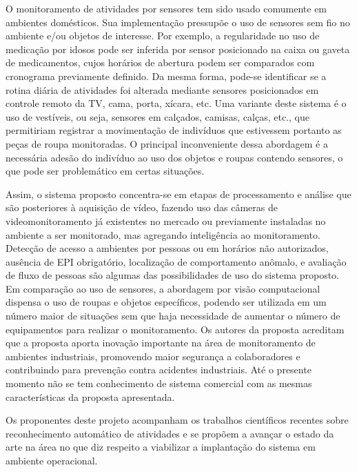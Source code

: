 O monitoramento de atividades por sensores tem sido usado comumente em ambientes domésticos. Sua implementação pressupõe o uso de sensores sem fio no ambiente e/ou objetos de interesse. Por exemplo, a regularidade no uso de medicação por idosos pode ser inferida por sensor posicionado na caixa ou gaveta de medicamentos, cujos horários de abertura podem ser comparados com cronograma previamente definido. Da mesma forma, pode-se identificar se a rotina diária de atividades foi alterada mediante sensores posicionados em controle remoto da TV, cama, porta, xícara, etc. Uma variante deste sistema é o uso de vestíveis, ou seja, sensores em calçados, camisas, calças, etc., que permitiriam registrar a movimentação de indivíduos que estivessem portanto as peças de roupa monitoradas. O principal inconveniente dessa abordagem é a necessária adesão do indivíduo ao uso dos objetos e roupas contendo sensores, o que pode ser problemático em certas situações.

Assim, o sistema proposto concentra-se em etapas de processamento e análise que são posteriores à aquisição de vídeo, fazendo uso das câmeras de videomonitoramento já existentes no mercado ou previamente instaladas no ambiente a ser monitorado, mas agregando inteligência ao monitoramento. Detecção de acesso a ambientes por pessoas ou em horários não autorizados, ausência de EPI obrigatório, localização de comportamento anômalo, e avaliação de fluxo de pessoas são algumas das possibilidades de uso do sistema proposto. Em comparação ao uso de sensores, a abordagem por visão computacional dispensa o uso de roupas e objetos específicos, podendo ser utilizada em um número maior de situações sem que haja necessidade de aumentar o número de equipamentos para realizar o monitoramento. Os autores da proposta acreditam que a  proposta aporta inovação importante na área de  monitoramento de ambientes industriais, promovendo maior segurança a colaboradores e contribuindo para prevenção contra acidentes industriais. Até o presente momento não se tem conhecimento de sistema comercial com as mesmas características da proposta apresentada.

Os proponentes deste projeto acompanham os trabalhos científicos recentes sobre reconhecimento automático de atividades e se propõem a avançar o estado da arte na área no que diz respeito a viabilizar a implantação do sistema em ambiente operacional.

